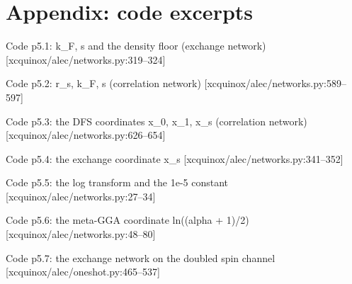 \section*{Appendix: code excerpts}
\begin{frame}[allowframebreaks]{Code p5.1: k\_F, s and the density floor (exchange network) [xcquinox/alec/networks.py:319--324]}
\label{code:p5_1_k_f_s_and_the_density_floor_exchange_net}
\end{frame}
\begin{frame}[allowframebreaks]{Code p5.2: r\_s, k\_F, s (correlation network) [xcquinox/alec/networks.py:589--597]}
\label{code:p5_2_r_s_k_f_s_correlation_network}
\end{frame}
\begin{frame}[allowframebreaks]{Code p5.3: the DFS coordinates x\_0, x\_1, x\_s (correlation network) [xcquinox/alec/networks.py:626--654]}
\label{code:p5_3_the_dfs_coordinates_x_0_x_1_x_s_correlat}
\end{frame}
\begin{frame}[allowframebreaks]{Code p5.4: the exchange coordinate x\_s [xcquinox/alec/networks.py:341--352]}
\label{code:p5_4_the_exchange_coordinate_x_s}
\end{frame}
\begin{frame}[allowframebreaks]{Code p5.5: the log transform and the 1e-5 constant [xcquinox/alec/networks.py:27--34]}
\label{code:p5_5_the_log_transform_and_the_1e_5_constant}
\end{frame}
\begin{frame}[allowframebreaks]{Code p5.6: the meta-GGA coordinate ln((alpha + 1)/2) [xcquinox/alec/networks.py:48--80]}
\label{code:p5_6_the_meta_gga_coordinate_ln_alpha_1_2}
\end{frame}
\begin{frame}[allowframebreaks]{Code p5.7: the exchange network on the doubled spin channel [xcquinox/alec/oneshot.py:465--537]}
\label{code:p5_7_the_exchange_network_on_the_doubled_spin}
\end{frame}
